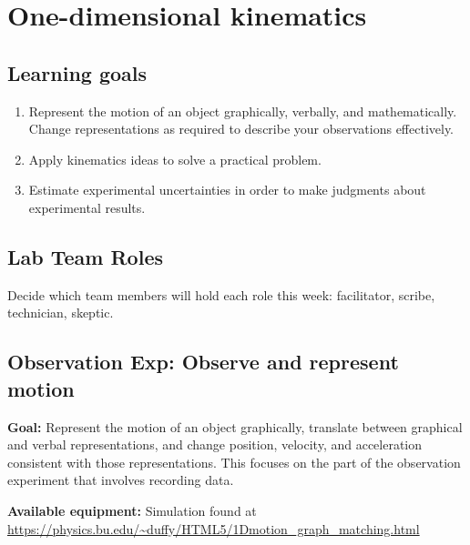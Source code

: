 \chapter{One-dimensional kinematics}

\section{Learning goals}

\begin{enumerate}
 \item Represent the motion of an object graphically, verbally, and mathematically. Change representations as required to describe your observations effectively.
 
 \item Apply kinematics ideas to solve a practical problem.
 
 \item Estimate experimental uncertainties in order to make judgments about experimental results.
\end{enumerate}

\section{Lab Team Roles}

Decide which team members will hold each role this week: facilitator, scribe, technician, skeptic.

\section{Observation Exp: Observe and represent motion}

\textbf{Goal:} Represent the motion of an object graphically, translate between graphical and verbal representations, and change position, velocity, and acceleration consistent with those representations. This focuses on the part of the observation experiment that involves recording data.

\textbf{Available equipment:} Simulation found at \url{https://physics.bu.edu/~duffy/HTML5/1Dmotion_graph_matching.html}

